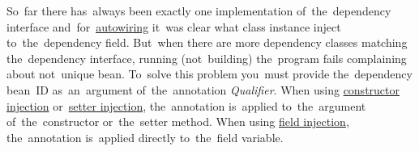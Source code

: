 So~far there has~always been exactly one implementation of~the~dependency interface and~for~\hyperref[autowiring]{autowiring} it~was clear what class instance inject to~the~dependency field. But~when there are more dependency classes matching the~dependency interface, running (not~building) the~program fails complaining about not~unique bean. To~solve this problem you~must provide the~dependency bean~ID as~an~argument of~the~annotation \textit{Qualifier}. When using \hyperref[constructorinjectionautowire]{constructor injection} or~\hyperref[setterinjectionautowire]{setter injection}, the~annotation is~applied to~the~argument of~the~constructor or~the~setter method. When using \hyperref[fieldinjection]{field injection}, the~annotation is~applied directly to~the~field variable.

